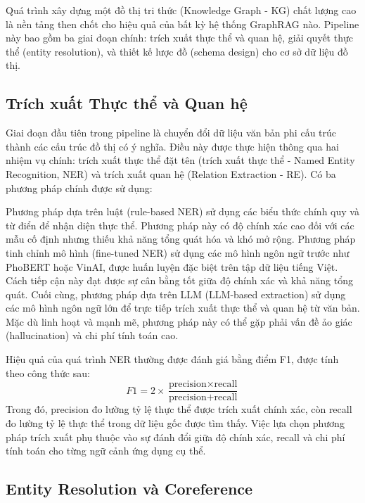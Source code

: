 Quá trình xây dựng một đồ thị tri thức (Knowledge Graph - KG) chất lượng cao là nền tảng then chốt cho hiệu quả của bất kỳ hệ thống GraphRAG nào. Pipeline này bao gồm ba giai đoạn chính: trích xuất thực thể và quan hệ, giải quyết thực thể (entity resolution), và thiết kế lược đồ (schema design) cho cơ sở dữ liệu đồ thị.

\subsection{Trích xuất Thực thể và Quan hệ}
\label{subsec:ner_relation_extraction}

Giai đoạn đầu tiên trong pipeline là chuyển đổi dữ liệu văn bản phi cấu trúc thành các cấu trúc đồ thị có ý nghĩa. Điều này được thực hiện thông qua hai nhiệm vụ chính: trích xuất thực thể đặt tên (trích xuất thực thể - Named Entity Recognition, NER) và trích xuất quan hệ (Relation Extraction - RE). Có ba phương pháp chính được sử dụng:

Phương pháp dựa trên luật (rule-based NER) sử dụng các biểu thức chính quy và từ điển để nhận diện thực thể. Phương pháp này có độ chính xác cao đối với các mẫu cố định nhưng thiếu khả năng tổng quát hóa và khó mở rộng. Phương pháp tinh chỉnh mô hình (fine-tuned NER) sử dụng các mô hình ngôn ngữ trước như PhoBERT hoặc VinAI, được huấn luyện đặc biệt trên tập dữ liệu tiếng Việt. Cách tiếp cận này đạt được sự cân bằng tốt giữa độ chính xác và khả năng tổng quát. Cuối cùng, phương pháp dựa trên LLM (LLM-based extraction) sử dụng các mô hình ngôn ngữ lớn để trực tiếp trích xuất thực thể và quan hệ từ văn bản. Mặc dù linh hoạt và mạnh mẽ, phương pháp này có thể gặp phải vấn đề ảo giác (hallucination) và chi phí tính toán cao.

Hiệu quả của quá trình NER thường được đánh giá bằng điểm F1, được tính theo công thức sau:
\begin{equation}
F1 = 2 \times \frac{\text{precision} \times \text{recall}}{\text{precision} + \text{recall}}
\label{eq:f1_ner}
\end{equation}
Trong đó, precision đo lường tỷ lệ thực thể được trích xuất chính xác, còn recall đo lường tỷ lệ thực thể trong dữ liệu gốc được tìm thấy. Việc lựa chọn phương pháp trích xuất phụ thuộc vào sự đánh đổi giữa độ chính xác, recall và chi phí tính toán cho từng ngữ cảnh ứng dụng cụ thể.

\subsection{Entity Resolution và Coreference}
\label{subsec:entity_resolution}

